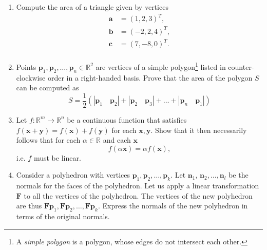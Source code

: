 \documentclass{article}
\DeclareMathOperator{\rank}{rank}
\newcommand{\bbR}{\mathbb{R}}
\newcommand{\bx}{\mathbf{x}}
\newcommand{\bb}{\mathbf{b}}
\newcommand{\bn}{\mathbf{n}}
\newcommand{\bF}{\mathbf{F}}
\newcommand{\ba}{\mathbf{a}}
\newcommand{\bc}{\mathbf{c}}
\newcommand{\dd}{\mathrm{d}}
\newcommand{\pd}[2]{\frac{\partial #1}{\partial #2}}
\newcommand{\by}{\mathbf{y}}
\newcommand{\bp}{\mathbf{p}}
\begin{document}
\begin{enumerate}
\item Compute the area of a triangle given by vertices
\begin{align*}
 \ba &= (1, 2, 3)^T, \\
 \bb &= (-2, 2, 4)^T, \\
 \bc &= (7, -8, 0)^T.\\
\end{align*}

\item Points $\bp_1, \bp_2, \dots, \bp_n \in \bbR^2$ are vertices of a simple polygon\footnote{A \emph{simple polygon} is a polygon, whose edges do not intersect each other.} listed in counter-clockwise order in a right-handed basis.
Prove that the area of the polygon $S$ can be computed as
\[
S = \frac{1}{2}(|\bp_1 \quad \bp_2| + |\bp_2 \quad \bp_3| + \dots + |\bp_n \quad \bp_1|)
\]

\item Let $f: \bbR^m\to\bbR^n$ be a continuous function that satisfies $f(\bx + \by) = f(\bx) + f(\by)$ for each $\bx, \by$. Show that it then necessarily follows that for each $\alpha \in \bbR$ and each $\bx$
$$
f(\alpha\bx) = \alpha f(\bx),
$$
i.e. $f$ must be linear.


\item
Consider a polyhedron with vertices $\bp_1, \bp_2, \dots, \bp_k$. Let $\bn_1$, $\bn_2, \dots, \bn_l$ be the normals for the faces of the polyhedron. Let us apply a linear transformation $\bF$ to all the vertices of the polyhedron. The vertices of the new polyhedron are thus $\bF\bp_1, \bF\bp_2, \dots, \bF\bp_k$. Express the normals of the new polyhedron in terms of the original normals.

\end{enumerate}
\end{document}
